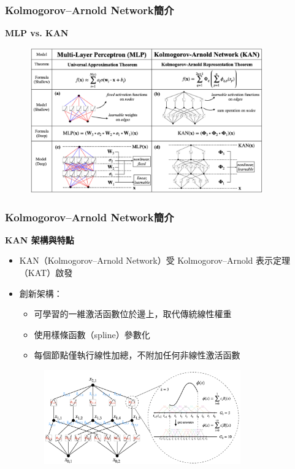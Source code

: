 \documentclass{beamer}
\begin{document}
\begin{frame}
    \frametitle{Kolmogorov–Arnold Network簡介}
    \centering
    \textbf{MLP vs. KAN}\\
    \begin{figure}               %
    \centering                 %
    \includegraphics[width=0.9\textwidth,keepaspectratio]{figures/MLP_vs_KAN.png}
    \end{figure}
\end{frame}

\begin{frame}
    \frametitle{Kolmogorov–Arnold Network簡介}
    \centering
    \textbf{KAN 架構與特點}\\[0.1cm]
    \begin{itemize}
        \item KAN（Kolmogorov–Arnold Network）受 Kolmogorov–Arnold 表示定理（KAT）啟發
        \item 創新架構：
        \begin{itemize}
            \item 可學習的一維激活函數位於邊上，取代傳統線性權重
            \item 使用樣條函數（spline）參數化
            \item 每個節點僅執行線性加總，不附加任何非線性激活函數
        \end{itemize}
        \begin{figure}
            \centering
            \includegraphics[width=0.8\textwidth,keepaspectratio]{figures/KAN架構.png}
        \end{figure}
    \end{itemize}
\end{frame}
\end{document}
